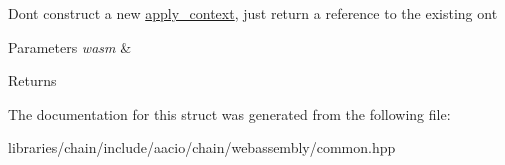 Don\textquotesingle{}t construct a new \mbox{\hyperlink{classaacio_1_1chain_1_1apply__context}{apply\+\_\+context}}, just return a reference to the existing ont 
\begin{DoxyParams}{Parameters}
{\em wasm} & \\
\hline
\end{DoxyParams}
\begin{DoxyReturn}{Returns}

\end{DoxyReturn}


The documentation for this struct was generated from the following file\+:\begin{DoxyCompactItemize}
\item 
libraries/chain/include/aacio/chain/webassembly/common.\+hpp\end{DoxyCompactItemize}
